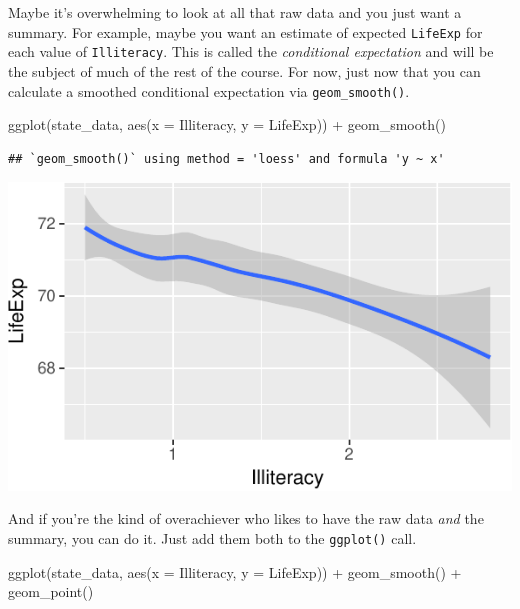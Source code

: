 \documentclass[
  12pt,
  oneside,openany]{book}
\newenvironment{Shaded}{\begin{snugshade}}{\end{snugshade}}
\newcommand{\AttributeTok}[1]{\textcolor[rgb]{0.77,0.63,0.00}{#1}}
\newcommand{\FunctionTok}[1]{\textcolor[rgb]{0.00,0.00,0.00}{#1}}
\newcommand{\NormalTok}[1]{#1}
\newcommand{\SpecialCharTok}[1]{\textcolor[rgb]{0.00,0.00,0.00}{#1}}
\begin{document}
Maybe it's overwhelming to look at all that raw data and you just want a summary. For example, maybe you want an estimate of expected \texttt{LifeExp} for each value of \texttt{Illiteracy}. This is called the \emph{conditional expectation} and will be the subject of much of the rest of the course. For now, just now that you can calculate a smoothed conditional expectation via \texttt{geom\_smooth()}.

\begin{Shaded}
\begin{Highlighting}[]
\FunctionTok{ggplot}\NormalTok{(state\_data, }\FunctionTok{aes}\NormalTok{(}\AttributeTok{x =}\NormalTok{ Illiteracy, }\AttributeTok{y =}\NormalTok{ LifeExp)) }\SpecialCharTok{+}
  \FunctionTok{geom\_smooth}\NormalTok{()}
\end{Highlighting}
\end{Shaded}

\begin{verbatim}
## `geom_smooth()` using method = 'loess' and formula 'y ~ x'
\end{verbatim}

\includegraphics{pdaps_files/figure-latex/smooth-1.pdf}

And if you're the kind of overachiever who likes to have the raw data \emph{and} the summary, you can do it. Just add them both to the \texttt{ggplot()} call.

\begin{Shaded}
\begin{Highlighting}[]
\FunctionTok{ggplot}\NormalTok{(state\_data, }\FunctionTok{aes}\NormalTok{(}\AttributeTok{x =}\NormalTok{ Illiteracy, }\AttributeTok{y =}\NormalTok{ LifeExp)) }\SpecialCharTok{+}
  \FunctionTok{geom\_smooth}\NormalTok{() }\SpecialCharTok{+}
  \FunctionTok{geom\_point}\NormalTok{()}
\end{Highlighting}
\end{Shaded}
\end{document}

